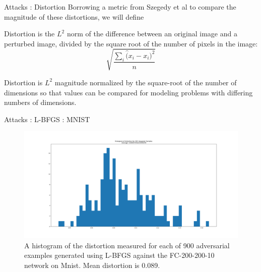 \begin{frame}{Attacks : Distortion}
    Borrowing a metric from Szegedy et al to compare the magnitude of these distortions, we will define
\begin{definition}{Distortion is the $L^2$ norm of the difference between an original image and a perturbed image, divided by the square root of the number of pixels in the image: }
\[\sqrt{\dfrac{\sum_i \hat (x_i - x_i)^2}{n}}\]
\end{definition}
Distortion is $L^2$ magnitude normalized by the square-root of the number of dimensions so that values can be compared for modeling problems with differing numbers of dimensions. 
\end{frame}

\begin{frame}{Attacks : L-BFGS : MNIST}
    \begin{figure}[H]
\label{lbfgsh}
\includegraphics[trim=200 80 100 100, clip, width=12cm]{2019-04-10-adverse/mnist_examples/FC200-200-10-distortion_hist.png}
\caption{A histogram of the distortion measured for each of 900 adversarial examples generated using L-BFGS against the FC-200-200-10 network on Mnist. Mean distortion is 0.089.}
\end{figure}
\end{frame}

